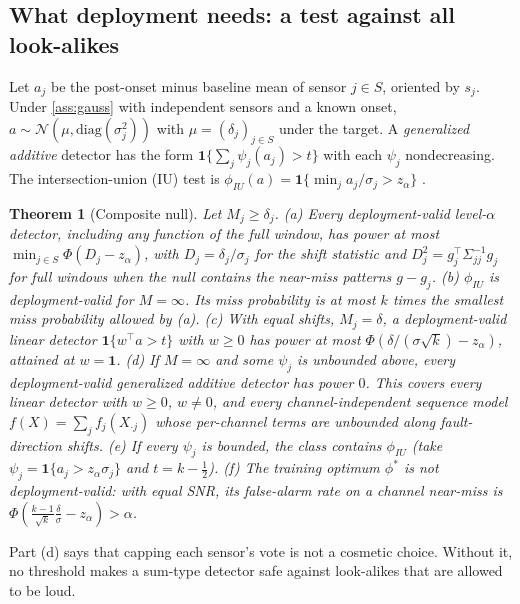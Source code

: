 \documentclass{article}
\newtheorem{theorem}{Theorem}
\theoremstyle{definition}
\theoremstyle{remark}
\renewcommand{\1}{\mathbf{1}}
\newcommand{\cN}{\mathcal{N}}
\begin{document}
\subsection{What deployment needs: a test against all look-alikes}
\label{sec:composite}
Let $a_j$ be the post-onset minus baseline mean of sensor $j\in S$, oriented by $s_j$. Under \cref{ass:gauss} with independent sensors and a known onset, $a\sim\cN(\mu,\mathrm{diag}(\sigma_j^2))$ with $\mu=(\delta_j)_{j\in S}$ under the target. A \emph{generalized additive} detector has the form $\1\{\sum_{j}\psi_j(a_j)>t\}$ with each $\psi_j$ nondecreasing. The intersection-union (IU) test is $\phi_{IU}(a)=\1\{\min_j a_j/\sigma_j>z_\alpha\}$ \citep{berger1982}.
\begin{theorem}[Composite null]\label{thm:composite}
Let $M_j\ge\delta_j$.
(a) Every deployment-valid level-$\alpha$ detector, including any function of the full window, has power at most $\min_{j\in S}\Phi(D_j-z_\alpha)$, with $D_j=\delta_j/\sigma_j$ for the shift statistic and $D_j^2=g_j^\top\Sigma_{jj}^{-1}g_j$ for full windows when the null contains the near-miss patterns $g-g_j$.
(b) $\phi_{IU}$ is deployment-valid for $M=\infty$. Its miss probability is at most $k$ times the smallest miss probability allowed by (a).
(c) With equal shifts, $M_j=\delta$, a deployment-valid linear detector $\1\{w^\top a>t\}$ with $w\ge0$ has power at most $\Phi(\delta/(\sigma\sqrt k)-z_\alpha)$, attained at $w=\1$.
(d) If $M=\infty$ and some $\psi_j$ is unbounded above, every deployment-valid generalized additive detector has power $0$. This covers every linear detector with $w\ge0$, $w\ne0$, and every channel-independent sequence model $f(X)=\sum_jf_j(X_{\cdot j})$ whose per-channel terms are unbounded along fault-direction shifts.
(e) If every $\psi_j$ is bounded, the class contains $\phi_{IU}$ (take $\psi_j=\1\{a_j>z_\alpha\sigma_j\}$ and $t=k-\frac12$).
(f) The training optimum $\phi^*$ is not deployment-valid: with equal SNR, its false-alarm rate on a channel near-miss is $\Phi(\frac{k-1}{\sqrt k}\frac{\delta}{\sigma}-z_\alpha)>\alpha$.
\end{theorem}
Part (d) says that capping each sensor's vote is not a cosmetic choice. Without it, no threshold makes a sum-type detector safe against look-alikes that are allowed to be loud.
\end{document}
